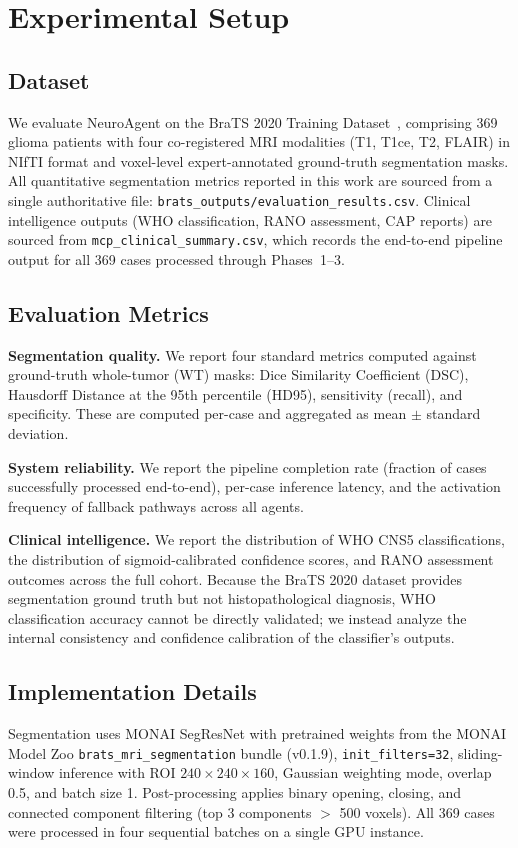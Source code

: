 \section{Experimental Setup}

\subsection{Dataset}
We evaluate NeuroAgent on the BraTS 2020 Training Dataset~\cite{menze2015brats, bakas2018brats}, comprising 369 glioma patients with four co-registered MRI modalities (T1, T1ce, T2, FLAIR) in NIfTI format and voxel-level expert-annotated ground-truth segmentation masks. All quantitative segmentation metrics reported in this work are sourced from a single authoritative file: \texttt{brats\_outputs/evaluation\_results.csv}. Clinical intelligence outputs (WHO classification, RANO assessment, CAP reports) are sourced from \texttt{mcp\_clinical\_summary.csv}, which records the end-to-end pipeline output for all 369 cases processed through Phases~1--3.

\subsection{Evaluation Metrics}
\textbf{Segmentation quality.} We report four standard metrics computed against ground-truth whole-tumor (WT) masks: Dice Similarity Coefficient (DSC), Hausdorff Distance at the 95th percentile (HD95), sensitivity (recall), and specificity. These are computed per-case and aggregated as mean $\pm$ standard deviation.

\textbf{System reliability.} We report the pipeline completion rate (fraction of cases successfully processed end-to-end), per-case inference latency, and the activation frequency of fallback pathways across all agents.

\textbf{Clinical intelligence.} We report the distribution of WHO CNS5 classifications, the distribution of sigmoid-calibrated confidence scores, and RANO assessment outcomes across the full cohort. Because the BraTS 2020 dataset provides segmentation ground truth but not histopathological diagnosis, WHO classification accuracy cannot be directly validated; we instead analyze the internal consistency and confidence calibration of the classifier's outputs.

\subsection{Implementation Details}
Segmentation uses MONAI SegResNet with pretrained weights from the MONAI Model Zoo \texttt{brats\_mri\_segmentation} bundle (v0.1.9), \texttt{init\_filters=32}, sliding-window inference with ROI $240 \times 240 \times 160$, Gaussian weighting mode, overlap 0.5, and batch size 1. Post-processing applies binary opening, closing, and connected component filtering (top 3 components $>$ 500 voxels). All 369 cases were processed in four sequential batches on a single GPU instance.

